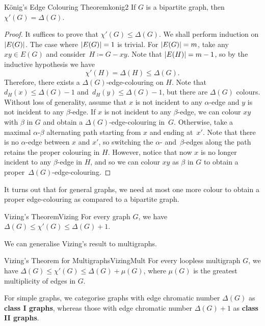 \documentclass[math]{amznotes}
\theoremstyle{remark}
\begin{document}
\begin{thmbox}{K\"{o}nig's Edge Colouring Theorem}{konig2}
    If $G$ is a bipartite graph, then $\chi'(G) = \Delta(G)$.
    \tcblower
    \begin{proof}
        It suffices to prove that $\chi'(G) \leq \Delta(G)$. We shall perform induction on ${\left\lvert {E(G)} \right\rvert}$. The case where ${\left\lvert {E(G)} \right\rvert} = 1$ is trivial. For ${\left\lvert {E(G)} \right\rvert} = m$, take any $xy \in E(G)$ and consider~$H \coloneqq G - xy$. Note that ${\left\lvert {E(H)} \right\rvert} = m - 1$, so by the inductive hypothesis we have 
        \begin{equation*}
            \chi'(H) = \Delta(H) \leq \Delta(G).
        \end{equation*}
        Therefore, there exists a $\Delta(G)$-edge-colouring on $H$. Note that $d_H(x) \leq \Delta(G) - 1$ and~$d_H(y) \leq \Delta(G) - 1$, but there are $\Delta(G)$ colours. Without loss of generality, assume that $x$ is not incident to any $\alpha$-edge and $y$ is not incident to any $\beta$-edge. If $x$ is not incident to any $\beta$-edge, we can colour $xy$ with $\beta$ in $G$ and obtain a $\Delta(G)$-edge-colouring in~$G$. Otherwise, take a maximal $\alpha$-$\beta$ alternating path starting from $x$ and ending at~$x'$. Note that there is no $\alpha$-edge between $x$ and $x'$, so switching the $\alpha$- and~$\beta$-edges along the path retains the proper colouring in $H$. However, notice that now $x$ is no longer incident to any $\beta$-edge in $H$, and so we can colour $xy$ as $\beta$ in $G$ to obtain a proper~$\Delta(G)$-edge-colouring.
    \end{proof}
\end{thmbox}
It turns out that for general graphs, we need at most one more colour to obtain a proper edge-colouring as compared to a bipartite graph.
\begin{thmbox}{Vizing's Theorem}{Vizing}
    For every graph $G$, we have $\Delta(G) \leq \chi'(G) \leq \Delta(G) + 1$.
\end{thmbox}
We can generalise Vizing's result to multigraphs.
\begin{corbox}{Vizing's Theorem for Multigraphs}{VizingMult}
    For every loopless multigraph $G$, we have $\Delta(G) \leq \chi'(G) \leq \Delta(G) + \mu(G)$, where $\mu(G)$ is the greatest multiplicity of edges in $G$.
\end{corbox}
For simple graphs, we categorise graphs with edge chromatic number $\Delta\left(G\right)$ as \textbf{class I graphs}, whereas those with edge chromatic number $\Delta\left(G\right) + 1$ as \textbf{class II graphs}.
\end{document}
